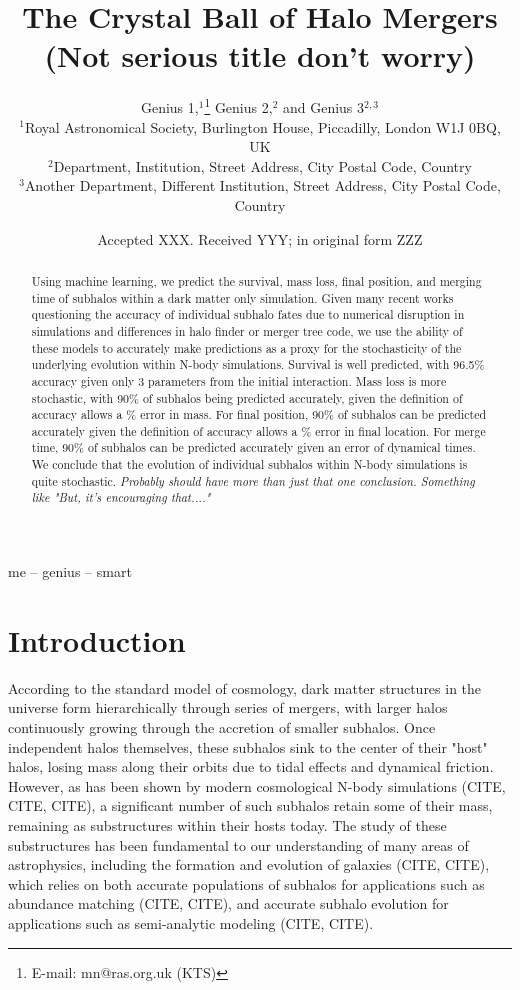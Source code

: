 \documentclass[fleqn,usenatbib]{mnras}
\title[Abbie=Smart Person]{The Crystal Ball of Halo Mergers (Not serious title don't worry)}
\author[K. T. Smith et al.]{
Genius 1,$^{1}$\thanks{E-mail: mn@ras.org.uk (KTS)}
Genius 2,$^{2}$
and Genius 3$^{2,3}$
\\
$^{1}$Royal Astronomical Society, Burlington House, Piccadilly, London W1J 0BQ, UK\\
$^{2}$Department, Institution, Street Address, City Postal Code, Country\\
$^{3}$Another Department, Different Institution, Street Address, City Postal Code, Country
}
\date{Accepted XXX. Received YYY; in original form ZZZ}
\begin{document}
\label{firstpage}
\pagerange{\pageref{firstpage}--\pageref{lastpage}}
\maketitle

\begin{abstract}
Using machine learning, we predict the survival, mass loss, final position, and merging time of subhalos within a dark matter only simulation. Given many recent works questioning the accuracy of individual subhalo fates due to numerical disruption in simulations and differences in halo finder or merger tree code, we use the ability of these models to accurately make predictions as a proxy for the stochasticity of the underlying evolution within N-body simulations. Survival is well predicted, with 96.5\% accuracy given only 3 parameters from the initial interaction. Mass loss is more stochastic, with 90\% of subhalos being predicted accurately, given the definition of accuracy allows a \% error in mass. For final position, 90\% of subhalos can be predicted accurately given the definition of accuracy allows a \% error in final location. For merge time, 90\% of subhalos can be predicted accurately given an error of  dynamical times. We conclude that the evolution of individual subhalos within N-body simulations is quite stochastic. \textit{Probably should have more than just that one conclusion. Something like "But, it's encouraging that...."}
\end{abstract}

\begin{keywords}
me -- genius -- smart
\end{keywords}



\section{Introduction}

According to the standard \LambdaCDM model of cosmology, dark matter structures in the universe form hierarchically through series of mergers, with larger halos continuously growing through the accretion of smaller subhalos. Once independent halos themselves, these subhalos sink to the center of their "host" halos, losing mass along their orbits due to tidal effects and dynamical friction. However, as has been shown by modern cosmological N-body simulations (CITE, CITE, CITE), a significant number of such subhalos retain some of their mass, remaining as substructures within their hosts today. The study of these substructures has been fundamental to our understanding of many areas of astrophysics, including the formation and evolution of galaxies (CITE, CITE), which relies on both accurate populations of subhalos for applications such as abundance matching (CITE, CITE), and accurate subhalo evolution for applications such as semi-analytic modeling (CITE, CITE).
\end{document}
